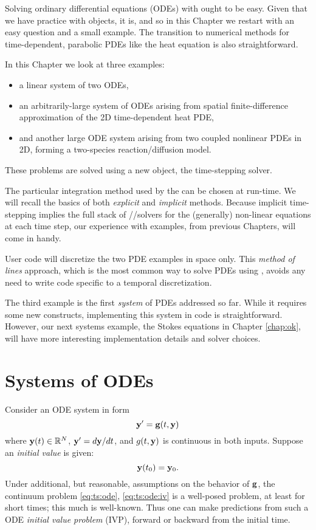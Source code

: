 
Solving ordinary differential equations (ODEs) with \PETSc ought to be easy.  Given that we have practice with \PETSc objects, it is, and so in this Chapter we restart with an easy question and a small example.  The transition to numerical methods for time-dependent, parabolic PDEs like the heat equation is also straightforward.

In this Chapter we look at three examples:
\begin{itemize}
\item a linear system of two ODEs,
\item an arbitrarily-large system of ODEs arising from spatial finite-difference approximation of the 2D time-dependent heat PDE,
\item and another large ODE system arising from two coupled nonlinear PDEs in 2D, forming a two-species reaction/diffusion model.
\end{itemize}
These problems are solved using a new \PETSc object, the \pTS time-stepping solver.

The particular integration method used by the \pTS can be chosen at run-time.  We will recall the basics of both \emph{explicit} and \emph{implicit} methods.  Because implicit time-stepping implies the full stack of \pSNES/\pKSP/\pPC solvers for the (generally) non-linear equations at each time step, our experience with \pSNES examples, from previous Chapters, will come in handy.

User code will discretize the two PDE examples in space only.  This \emph{method of lines} approach, which is the most common way to solve PDEs using \PETSc \pTS, avoids any need to write code specific to a temporal discretization.

The third example is the first \emph{system} of PDEs addressed so far.  While it requires some new constructs, implementing this system in \PETSc code is straightforward.  However, our next systems example, the Stokes equations in Chapter \ref{chap:ok}, will have more interesting implementation details and solver choices.

\section{Systems of ODEs}  Consider an ODE system in form
\begin{equation}
\mathbf{y}' = \mathbf{g}(t,\mathbf{y})  \label{eq:ts:ode}
\end{equation}
where $\mathbf{y}(t) \in \mathbb{R}^N$, $\mathbf{y}'=d\mathbf{y}/dt$, and $g(t,\mathbf{y})$ is continuous in both inputs.  Suppose an \emph{initial value} is given:
\begin{equation}
\mathbf{y}(t_0) = \mathbf{y}_0.  \label{eq:ts:ode:iv}
\end{equation}
Under additional, but reasonable, assumptions on the behavior of $\mathbf{g}$, the continuum problem \eqref{eq:ts:ode}, \eqref{eq:ts:ode:iv} is a well-posed problem, at least for short times; this much is well-known.  Thus one can make predictions from such a ODE \emph{initial value problem} (IVP), forward or backward from the initial time.

